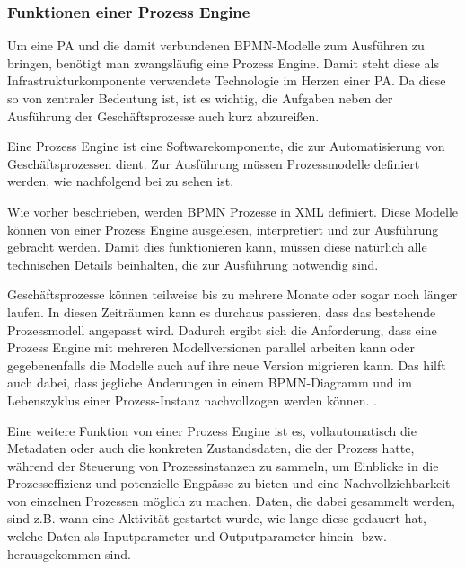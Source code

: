 \subsubsection{Funktionen einer Prozess Engine}
Um eine \acl{PA} und die damit verbundenen \ac{BPMN}-Modelle zum Ausführen zu bringen, benötigt man zwangsläufig eine Prozess Engine. Damit steht diese als Infrastrukturkomponente verwendete Technologie im Herzen einer \acl{PA}. Da diese so von zentraler Bedeutung ist, ist es wichtig, die Aufgaben neben der Ausführung der Geschäftsprozesse auch kurz abzureißen. \citep[vgl.][]{stiehl_prozessgesteuerte_2024}

Eine Prozess Engine ist eine Softwarekomponente, die zur Automatisierung von Geschäftsprozessen dient. Zur Ausführung müssen Prozessmodelle definiert werden, wie nachfolgend bei  zu sehen ist. \citep[vgl.][]{leymann_definition_2024}

Wie vorher beschrieben, werden \ac{BPMN} Prozesse in \ac{XML} definiert. Diese Modelle können von einer Prozess Engine ausgelesen, interpretiert und zur Ausführung gebracht werden. Damit dies funktionieren kann, müssen diese natürlich alle technischen Details beinhalten, die zur Ausführung notwendig sind. \citep[vgl.][S. 226]{freund_praxishandbuch_2017}

Geschäftsprozesse können teilweise bis zu mehrere Monate oder sogar noch länger laufen. In diesen Zeiträumen kann es durchaus passieren, dass das bestehende Prozessmodell angepasst wird. Dadurch ergibt sich die Anforderung, dass eine Prozess Engine mit mehreren Modellversionen parallel arbeiten kann oder gegebenenfalls die Modelle auch auf ihre neue Version migrieren kann. Das hilft auch dabei, dass jegliche Änderungen in einem \ac{BPMN}-Diagramm und im Lebenszyklus einer Prozess-Instanz nachvollzogen werden können. \citep[vgl.][S. 226]{freund_praxishandbuch_2017}.

Eine weitere Funktion von einer Prozess Engine ist es, vollautomatisch die Metadaten oder auch die konkreten Zustandsdaten, die der Prozess hatte, während der Steuerung von Prozessinstanzen zu sammeln, um Einblicke in die Prozesseffizienz und potenzielle Engpässe zu bieten und eine Nachvollziehbarkeit von einzelnen Prozessen möglich zu machen. Daten, die dabei gesammelt werden, sind z.B. wann eine Aktivität gestartet wurde, wie lange diese gedauert hat, welche Daten als Inputparameter und Outputparameter hinein- bzw. herausgekommen sind. \citep[vgl.][S. 7, 226]{freund_praxishandbuch_2017} \citep[vgl.][]{stiehl_prozessgesteuerte_2024} 

